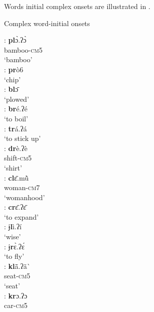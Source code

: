 \documentclass[output=paper]{langscibook}
\begin{document}
\noindent Words initial complex onsets are illustrated in . 

 \begin{exe}
    \ex Complex word-initial onsets \label{ex:traore:complexOnsetWordInitial:12}
    \nopagebreak
    \begin{multicols}{2}
    \begin{xlisti}
        \ex \glll [pl]: \textbf{pl}ɔ̀.ʔɔ̀ \\
            {}      bamboo-\textsc{cm}5\\
            {} ‘bamboo’\\ 
        \ex \gll [pr]: \textbf{pr}ò6\\
            {}  `chip'\\
        \ex \gll [bl]:        \textbf{bl}ɔ̄ \\
            {}      `plowed'\\
        \ex \gll [br]:      \textbf{br}é.ʔé \\
            {} {`to boil'}\\
        \ex \gll [tr]:        \textbf{tr}á.ʔá\\
            {}      {`to stick up'}\\
        \ex \glll [dr]:      \textbf{dr}è.ʔè \\
            {}      shift-\textsc{cm}5\\
            {}      `shirt'\\
        \ex \glll [cl]:       \textbf{cl}ɛ̄.mũ̀ \\
            {} woman-\textsc{cm}7\\
            {} `womanhood'\\
        \ex \gll [cr]:        \textbf{cr}ɛ̄.ʔɛ̄  \\
            {}          {`to expand'}\\
        \ex \gll [ɉl]:         ɉ\textbf{l}ì.ʔí\\
            {}          `wise'\\
        \ex  \gll [ɉr]:        ɉ\textbf{r}ɛ̀.ʔɛ́ \\
            {}          {`to fly'}\\
        \ex \glll [kl]:       \textbf{kl}ã\={}.ʔã\`{}~\\
            {} seat-\textsc{cm}5\\
            {} `seat'\\
        \ex \glll  [kr]:       \textbf{kr}ɔ.ʔɔ \\
            {} car-\textsc{cm}5\\

\end{xlisti}
\end{multicols}
\end{exe}
\end{document}
